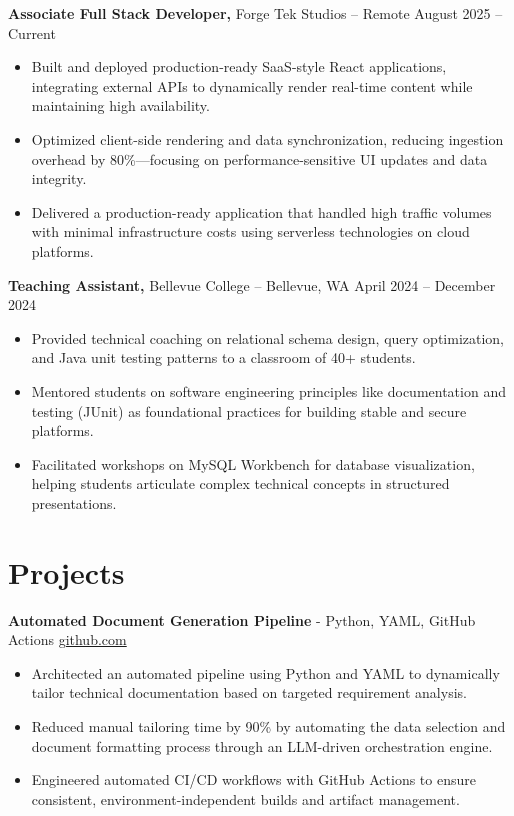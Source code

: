 \documentclass[11pt]{article}       %
\begin{document}
\textbf{Associate Full Stack Developer,} {Forge Tek Studios} -- Remote \hfill August 2025 -- Current 
\vspace{-9pt}
\begin{itemize}
  \item Built and deployed production-ready SaaS-style React applications, integrating external APIs to dynamically render real-time content while maintaining high availability.
  \item Optimized client-side rendering and data synchronization, reducing ingestion overhead by 80\%—focusing on performance-sensitive UI updates and data integrity.
  \item Delivered a production-ready application that handled high traffic volumes with minimal infrastructure costs using serverless technologies on cloud platforms.
\end{itemize}

\textbf{Teaching Assistant,} {Bellevue College} -- Bellevue, WA \hfill April 2024 -- December 2024 \\
\vspace{-9pt}
\begin{itemize}
  \item Provided technical coaching on relational schema design, query optimization, and Java unit testing patterns to a classroom of 40+ students.
  \item Mentored students on software engineering principles like documentation and testing (JUnit) as foundational practices for building stable and secure platforms.
  \item Facilitated workshops on MySQL Workbench for database visualization, helping students articulate complex technical concepts in structured presentations.
\end{itemize}

\vspace{-18.5pt}

\section*{Projects}

\textbf{Automated Document Generation Pipeline}{ - Python, YAML, GitHub Actions} \hfill \href{https://github.com/Monica20030707/Tex_OrangeLeaf-mcp}{github.com} \\
\vspace{-9pt}
\begin{itemize}
  \item Architected an automated pipeline using Python and YAML to dynamically tailor technical documentation based on targeted requirement analysis.
  \item Reduced manual tailoring time by 90\% by automating the data selection and document formatting process through an LLM-driven orchestration engine.
  \item Engineered automated CI/CD workflows with GitHub Actions to ensure consistent, environment-independent builds and artifact management.
\end{itemize}
\end{document}
